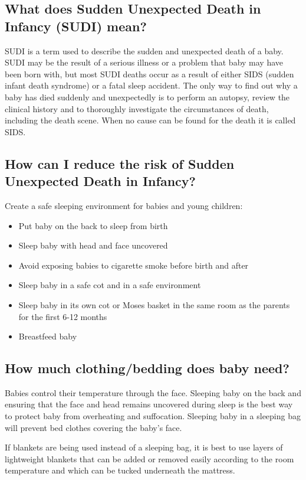 \subsection{What does Sudden Unexpected Death in Infancy (SUDI) mean?}
SUDI is a term used to describe the sudden and unexpected death of a baby. SUDI may be the result 
of a serious illness or a problem that baby may have been born with, but most SUDI deaths occur as 
a result of either SIDS (sudden infant death syndrome) or a fatal sleep accident.
The only way to find out why a baby has died suddenly and unexpectedly is to perform an
autopsy, review the clinical history and to thoroughly investigate the circumstances of death, 
including the death scene. When no cause can be found for the death it
is called SIDS.

\subsection{How can I reduce the risk of Sudden Unexpected Death in Infancy?}

Create a safe sleeping environment for babies and young children:

\begin{itemize}
\item Put baby on the back to sleep from birth
\item Sleep baby with head and face uncovered 
\item Avoid exposing babies to cigarette smoke before birth and after
\item Sleep baby in a safe cot and in a safe environment
\item Sleep baby in its own cot or Moses basket in the same room as the parents for the first 6-12 months
\item Breastfeed baby
\end{itemize}

\subsection{How much clothing/bedding does baby need?}
Babies control their temperature through the face. Sleeping baby on the back and ensuring
that the face and head remains uncovered during sleep is the best way to protect baby
from overheating and suffocation. Sleeping baby in a sleeping bag will prevent 
bed clothes covering the baby’s face.

If blankets are being used instead of a sleeping bag, it is best to use layers of lightweight blankets 
that can be added or removed easily according to the room temperature and which can be tucked 
underneath the mattress.

